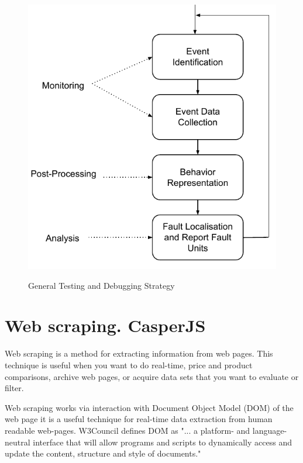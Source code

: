 \begin{figure}[ht]
	\centering
	\includegraphics[width=0.7\linewidth]{grafiken/GeneralTestingAndDebugging}
	\label{fig:GeneralTestingAndDebugging}
	\caption{General Testing and Debugging Strategy\cite{rtSandD}}
\end{figure}

\section{Web scraping. CasperJS}
\label{sec:scraping}
Web scraping is a method for extracting information from web pages\cite{wikiScraping}. This technique is useful when you want to do real-time, price and product comparisons, archive web pages, or acquire data sets that you want to evaluate or filter\cite{conScrap}.

Web scraping works via interaction with Document Object Model (DOM) of the web page it is a useful technique for real-time data extraction from human readable web-pages. W3Council defines DOM\cite{w3cDOM} as "... a platform- and language-neutral interface that will allow programs and scripts to dynamically access and update the content, structure and style of documents." 

